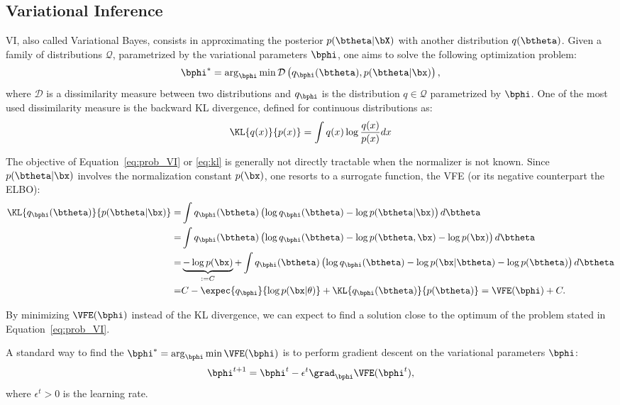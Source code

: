 \subsection{Variational Inference}
\label{sec:vi}
\acf{VI}, also called Variational Bayes, consists in approximating the posterior $p(\btheta|\bX)$ with another distribution $q(\btheta)$.
Given a family of distributions $\mathcal{Q}$, parametrized by the variational parameters $\bphi$, one aims to solve the following optimization problem:
\begin{align}
\bphi^* = \arg_{\bphi}\min \mathcal{D}\left(q_{\bphi}(\btheta), p(\btheta|\bx)\right),
\label{eq:prob_VI}
\end{align}
where $\mathcal{D}$ is a dissimilarity measure between two distributions and $q_{\bphi}$ is the distribution $q\in \mathcal{Q}$ parametrized by $\bphi$.
One of the most used dissimilarity measure is the backward \ac{KL} divergence, defined for continuous distributions as:
\begin{align}
\KL{q(x)}{p(x)} = \int q(x) \log \frac{q(x)}{p(x)}dx
\label{eq:kl}
\end{align}

The objective of Equation~\eqref{eq:prob_VI} or \eqref{eq:kl} is generally not directly tractable when the normalizer is not known.
Since $p(\btheta|\bx)$ involves the normalization constant $p(\bx)$, one resorts to a surrogate function, the \ac{VFE} (or its negative counterpart the \ac{ELBO}):
\begin{align}
\KL{q_{\bphi}(\btheta)}{p(\btheta|\bx)} =& \int q_{\bphi}(\btheta) \left(\log q_{\bphi}(\btheta) - \log p(\btheta|\bx)\right)d\btheta\nonumber\\
=&\int q_{\bphi}(\btheta) \left(\log q_{\bphi}(\btheta) - \log p(\btheta, \bx) - \log p(\bx)\right)d\btheta\nonumber\\
=&\underbrace{- \log p(\bx)}_{:=C} + \int q_{\bphi}(\btheta) \left(\log q_{\bphi}(\btheta) - \log p(\bx|\btheta)- \log p(\btheta) \right)d\btheta\nonumber\\
=& C -\expec{q_{\bphi}}{\log p(\bx|\theta)} + \KL{q_{\bphi}(\btheta)}{p(\btheta)} = \VFE(\bphi) + C.\label{eq:vfe}
\end{align}


By minimizing $\VFE(\bphi)$ instead of the \ac{KL} divergence, we can expect to find a solution close to the optimum of the problem stated in Equation~\eqref{eq:prob_VI}.

A standard way to find the $\bphi^* = \arg_{\bphi}\min \VFE(\bphi)$ is to perform gradient descent on the variational parameters $\bphi$:
\begin{align}
\bphi^{t+1} = \bphi^{t} - \epsilon^t \grad_{\bphi}\VFE(\bphi^{t}),
\label{eq:vigraddescent}
\end{align}
where $\epsilon^t > 0$ is the learning rate.

